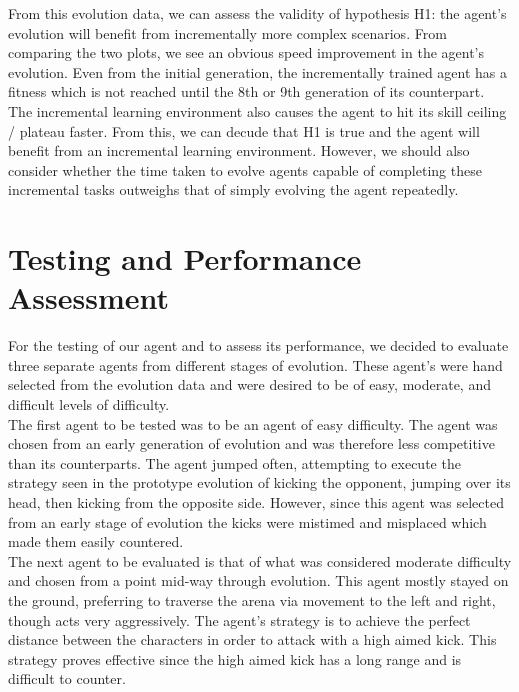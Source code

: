 \documentclass[12pt,a4paper]{article}
\begin{document}
From this evolution data, we can assess the validity of hypothesis H1: the agent's evolution will benefit from incrementally more complex scenarios. From comparing the two plots, we see an obvious speed improvement in the agent's evolution. Even from the initial generation, the incrementally trained agent has a fitness which is not reached until the 8th or 9th generation of its counterpart. The incremental learning environment also causes the agent to hit its skill ceiling / plateau faster. From this, we can decude that H1 is true and the agent will benefit from an incremental learning environment. However, we should also consider whether the time taken to evolve agents capable of completing these incremental tasks outweighs that of simply evolving the agent repeatedly.\\

\newpage
\section{Testing and Performance Assessment}
For the testing of our agent and to assess its performance, we decided to evaluate three separate agents from different stages of evolution. These agent's were hand selected from the evolution data and were desired to be of easy, moderate, and difficult levels of difficulty. \\

The first agent to be tested was to be an agent of easy difficulty. The agent was chosen from an early generation of evolution and was therefore less competitive than its counterparts. The agent jumped often, attempting to execute the strategy seen in the prototype evolution of kicking the opponent, jumping over its head, then kicking from the opposite side. However, since this agent was selected from an early stage of evolution the kicks were mistimed and misplaced which made them easily countered.\\

The next agent to be evaluated is that of what was considered moderate difficulty and chosen from a point mid-way through evolution. This agent mostly stayed on the ground, preferring to traverse the arena via movement to the left and right, though acts very aggressively. The agent's strategy is to achieve the perfect distance between the characters in order to attack with a high aimed kick. This strategy proves effective since the high aimed kick has a long range and is difficult to counter.\\
\end{document}
